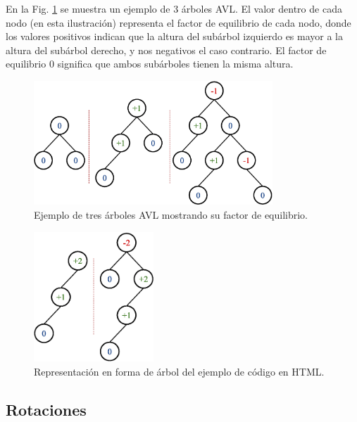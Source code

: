 En la Fig. \ref{fig:AVLExample1} se muestra un ejemplo de 3 árboles AVL. El valor dentro de cada nodo (en esta ilustración) representa el factor de equilibrio de cada nodo, donde los valores positivos indican que la altura del subárbol izquierdo es mayor a la altura del subárbol derecho, y nos negativos el caso contrario. El factor de equilibrio 0 significa que ambos subárboles tienen la misma altura.

\begin{figure}[htpb!]
  \begin{center}
    \includegraphics[width=0.8\textwidth]{images/AVLExample1.eps}
  \end{center}
  \caption{Ejemplo de tres árboles AVL mostrando su factor de equilibrio.}
  \label{fig:AVLExample1}
\end{figure}

\begin{figure}[htpb!]
  \begin{center}
    \includegraphics[width=0.4\textwidth]{images/AVLExample2.eps}
  \end{center}
  \caption{Representación en forma de árbol del ejemplo de código en HTML.}
  \label{fig:AVLExample2}
\end{figure}

\subsection{Rotaciones}

